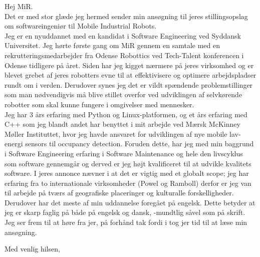 \documentclass[10pt,a4paper]{altacv}
\begin{document}


\makecvheader




Hej MiR.
\\
\vspace{5mm}
Det er med stor glæde jeg hermed sender min ansøgning til jeres stillingsopslag om softwareingeniør til Mobile Industrial Robots.
\\
\vspace{5mm}
Jeg er en nyuddannet med en kandidat i Software Engineering ved Syddansk Universitet.
Jeg hørte første gang om MiR gennem en samtale med en rekrutteringsmedarbejder fra Odense Robottics ved Tech-Talent konferencen i Odense tidligere på året.
Siden har jeg kigget nærmere på jeres virksomhed og er blevet grebet af jeres robotters evne til at effektivisere og optimere arbejdspladser rundt om i verden.
Derudover synes jeg det er vildt spændende problemstillinger som man nødvendigvis må blive stillet overfor ved udviklingen af selvkørende robotter som skal kunne fungere i omgivelser med mennesker.
\\

Jeg har 3 års erfaring med Python og Linux-platformen, og et års erfaring med C++ som jeg blandt andet har benyttet i mit arbejde ved Mærsk McKinney Møller Instituttet, hvor jeg havde ansvaret for udviklingen af nye mobile lav-energi sensors til occupancy detection.
Foruden dette, har jeg med min baggrund i Software Engineering erfaring i Software Maintenance og hele den livscyklus som software gennemgår og derved er jeg højt kvalificeret til at udvikle kvalitets software.
I jeres annonce nævner i at det er vigtig med et globalt scope; jeg har erfaring fra to internationale virksomheder (Powel og Ramboll) derfor er jeg van til arbejde på tværs af geografiske placeringer og kulturalle forskelligheder.
Derudover har det meste af min uddannelse foregået på engelsk.
Dette betyder at jeg er skarp faglig på både på engelsk og dansk, -mundtlig såvel som på skrift.
\\
\vspace{5mm} 
Jeg ser frem til at høre fra jer, på forhånd tak fordi i tog jer tid til at læse min ansøgning.


\vspace{5mm}
Med venlig hilsen,\\
\end{document}
